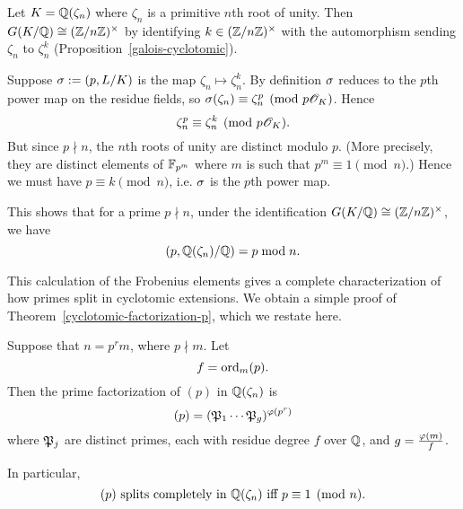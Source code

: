 \begin{ex}
Let $K=\mathbb{Q}(\zeta_n)$ where $\zeta_n$ is a primitive $n$th root of unity. Then $G(K/\mathbb{Q})\cong(\mathbb{Z}/n\mathbb{Z})^{\times}$ by identifying $k\in (\mathbb{Z}/n\mathbb{Z})^{\times}$ with the automorphism sending $\zeta_n$ to $\zeta_n^k$ %
(Proposition~\ref{galois-cyclotomic}).

Suppose $\sigma:=(p,L/K)$ is the map $\zeta_n\mapsto\zeta_n^k$. By definition $\sigma$ reduces to the $p$th power map on the residue fields, so $\sigma(\zeta_n)\equiv  \zeta_n^p\pmod{p\mathscr{O}_K}$. Hence
\[
\zeta_n^p\equiv \zeta_n^k\pmod{p\mathscr{O}_K}.
\]
But since $p\nmid n$, the $n$th roots of unity are distinct modulo $p$. (More precisely, they are distinct elements of $\mathbb{F}_{p^m}$ where $m$ is such that $p^m\equiv 1\pmod n$.) Hence we must have $p\equiv k\pmod n$, i.e. $\sigma$ is the $p$th power map.

This shows that for a prime $p\nmid n$, under the identification $G(K/\mathbb{Q})\cong(\mathbb{Z}/n\mathbb{Z})^{\times}$, we have
\[
(p,\mathbb{Q}(\zeta_n)/\mathbb{Q})=p\bmod n.
\]
\end{ex}
This calculation of the Frobenius elements gives a complete characterization of how primes split in cyclotomic extensions. We obtain a simple proof of Theorem~\ref{cyclotomic-factorization-p}, which we restate here.
\begin{thm}
Suppose that $n=p^rm$, where $p\nmid m$. Let 
\[
f=\operatorname{ord}_{m} (p).
\]
Then the prime factorization of $(p)$ in $\mathbb{Q}(\zeta_n)$ is
\[
(p)=(\mathfrak{P}_1\cdots \mathfrak{P}_g)^{\varphi(p^r)}
\]
where $\mathfrak{P}_j$ are distinct primes, each with residue degree $f$ over $\mathbb{Q}$, and $g=\frac{\varphi(m)}{f}$.

In particular, 
\[(p)
\text{ splits completely in $\mathbb{Q}(\zeta_n)$ iff }p\equiv 1\pmod n.\]
\end{thm}
